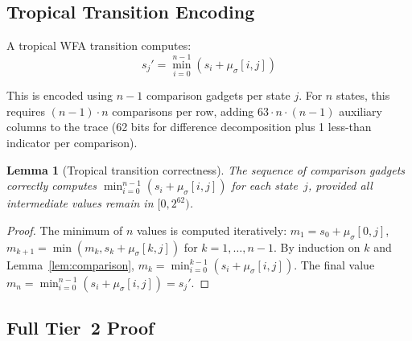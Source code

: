 \documentclass[11pt]{article}
\newtheorem{lemma}[theorem]{Lemma}
\begin{document}
\subsection{Tropical Transition Encoding}

A tropical WFA transition computes:
\[
  s_j' = \min_{i=0}^{n-1}(s_i + \mu_\sigma[i,j])
\]

This is encoded using $n-1$ comparison gadgets per state $j$.
For $n$ states, this requires $(n-1) \cdot n$ comparisons per row,
adding $63 \cdot n \cdot (n-1)$ auxiliary columns to the trace
(62 bits for difference decomposition plus 1 less-than indicator per comparison).

\begin{lemma}[Tropical transition correctness]\label{lem:tropical-trans}
The sequence of comparison gadgets correctly computes
$\min_{i=0}^{n-1}(s_i + \mu_\sigma[i,j])$ for each state~$j$,
provided all intermediate values remain in $[0, 2^{62})$.
\end{lemma}

\begin{proof}
The minimum of $n$ values is computed iteratively:
$m_1 = s_0 + \mu_\sigma[0,j]$,
$m_{k+1} = \min(m_k, s_k + \mu_\sigma[k,j])$ for $k = 1, \ldots, n-1$.
By induction on $k$ and Lemma~\ref{lem:comparison},
$m_k = \min_{i=0}^{k-1}(s_i + \mu_\sigma[i,j])$.
The final value $m_n = \min_{i=0}^{n-1}(s_i + \mu_\sigma[i,j]) = s_j'$.
\end{proof}

\subsection{Full Tier~2 Proof}
\end{document}
